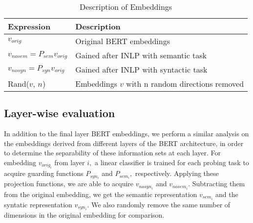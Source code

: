 \documentclass[11pt,a4paper]{article}
\begin{document}
\begin{table}[ht]
    \centering
    \begin{tabular}{p{4cm}p{3cm}}\hline
        \textbf{Expression} & \textbf{Description}\\ \hline 
        $v_{orig}$ & Original BERT embeddings  \\
        $v_{nosem} = P_{sem} v_{orig}$ & Gained after INLP with semantic task \\
        $v_{nosyn}= P_{syn} v_{orig}$ & Gained after INLP with syntactic task \\
        Rand($v$, $n$) & Embeddings $v$ with n random directions removed \\

        
        
        \hline
    \end{tabular}
    \caption{\label{description} Description of Embeddings
    }
\end{table}


\subsection{Layer-wise evaluation}
\label{layer}
In addition to the final layer BERT embeddings, we perform a similar analysis on the embeddings derived from different layers of the BERT architecture, in order to determine the separability of these information sets at each layer. For embedding $v_{orig_i}$ from layer $i,$ a linear classifier is trained for each probing task to acquire guarding functions $P_{syn_i}$ and $P_{sem_i},$ respectively. Applying these projection functions, we are able to acquire $v_{nosyn_i}$ and $v_{nosem_i}.$ Subtracting them from the original embedding, we get the semantic representation $v_{sem_i}$ and the syntatic representation $v_{syn_i}.$ We also randomly remove the same number of dimensions in the original embedding for comparison.
\end{document}
